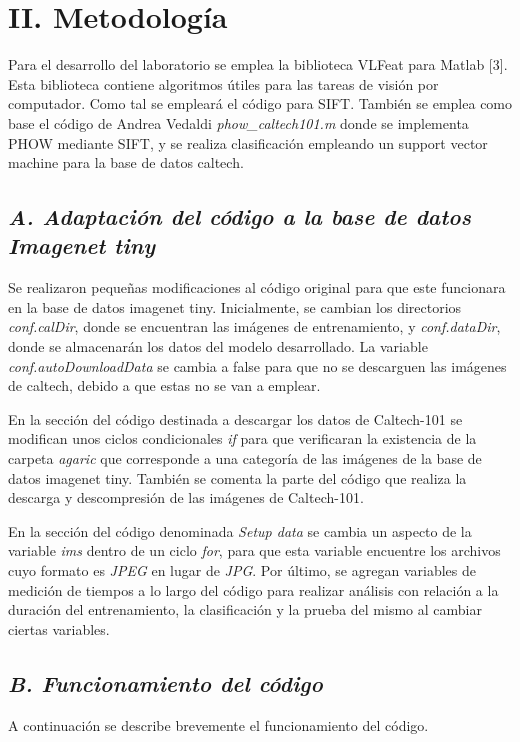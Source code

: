 \documentclass[10pt,twocolumn,letterpaper]{article}
\begin{document}
\section{\textbf{II. Metodología}}

Para el desarrollo del laboratorio se emplea la biblioteca VLFeat para Matlab [3]. Esta biblioteca contiene algoritmos útiles para las tareas de visión por computador. Como tal se empleará el código para SIFT. También se emplea como base el código de Andrea Vedaldi \textit{phow\_caltech101.m} donde se implementa PHOW mediante SIFT, y se realiza clasificación empleando un support vector machine para la base de datos caltech. 

\subsection{\textit{A. Adaptación del código a la base de datos Imagenet tiny}}

Se realizaron pequeñas modificaciones al código original para que este funcionara en la base de datos imagenet tiny. Inicialmente, se cambian los directorios \textit{conf.calDir}, donde se encuentran las imágenes de entrenamiento, y \textit{conf.dataDir}, donde se almacenarán los datos del modelo desarrollado. La variable \textit{conf.autoDownloadData} se cambia a false para que no se descarguen las imágenes de caltech, debido a que estas no se van a emplear. 

En la sección del código destinada a descargar los datos de Caltech-101 se modifican unos ciclos condicionales \textit{if} para que verificaran la existencia de la carpeta \textit{agaric} que corresponde a una categoría de las imágenes de la base de datos imagenet tiny. También se comenta la parte del código que realiza la descarga y descompresión de las imágenes de Caltech-101.

En la sección del código denominada \textit{Setup data} se cambia un aspecto de la variable \textit{ims} dentro de un ciclo \textit{for}, para que esta variable encuentre los archivos cuyo formato es \textit{JPEG} en lugar de \textit{JPG}. Por último, se agregan variables de medición de tiempos a lo largo del código para realizar análisis con relación a la duración del entrenamiento, la clasificación y la prueba del mismo al cambiar ciertas variables. 

\subsection{ \textit{B. Funcionamiento del código}}
A continuación se describe brevemente el funcionamiento del código. 
\end{document}
